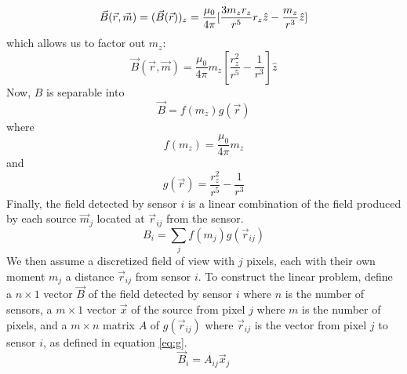 \documentclass[a4paper]{article}
\begin{document}
\begin{equation}
\centering
\vec{B}(\vec{r},\vec{m}) = (\vec{B}(\vec{r}))_{z} = \frac{\mu_{0}}{4\pi}[\frac{3m_{z}r_{z}}{r^{5}}r_{z}\hat{z} - \frac{m_{z}}{r^{3}}\hat{z}]
\end{equation}
which allows us to factor out $m_{z}$:
\begin{equation}
\vec{B}(\vec{r},\vec{m})=\frac{\mu_{0}}{4\pi}m_{z}[\frac{r_{z}^{2}}{r^{5}}-\frac{1}{r^{3}}]\hat{z}
\end{equation}
Now, $B$ is separable into 
\begin{equation}
\vec{B} = f(m_{z})g(\vec{r}) 
\end{equation}
where 
\begin{equation}
f(m_{z}) = \frac{\mu_{0}}{4\pi}m_{z}
\end{equation}
and 
\begin{equation} \label{eq:g}
g(\vec{r})=\frac{r_{z}^{2}}{r^{5}}-\frac{1}{r^{3}}
\end{equation}
Finally, the field detected by sensor $i$ is a linear combination of the field produced by each source $\vec{m}_{j}$ located at $\vec{r}_{ij}$ from the sensor.
\begin{equation}
B_{i}=\sum_{j}f(m_{j})g(\vec{r}_{ij})
\end{equation}
We then assume a discretized field of view with $j$ pixels, each with their own moment $m_{j}$ a distance $\vec{r}_{ij}$ from sensor $i$.  To construct the linear problem, define a $n\times1$ vector $\vec{B}$ of the field detected by sensor $i$ where $n$ is the number of sensors, a $m\times1$ vector $\vec{x}$ of the source from pixel $j$ where $m$ is the number of pixels, and a $m\times n$ matrix $A$ of $g(\vec{r}_{ij})$ where $\vec{r}_{ij}$ is the vector from pixel $j$ to sensor $i$, as defined in equation \ref{eq:g}.
\begin{equation}
\vec{B}_{i} = A_{ij}\vec{x}_{j}
\label{eq:Axb}
\end{equation}
\end{document}
